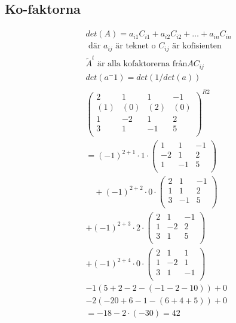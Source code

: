 \begin{multicols}{2}
\subsection{Ko-faktorna}
\begin{align*} %
  &det(A) = a_{i1}C_{i1}+a_{i2}C_{i2}+\ldots{}+a_{in}C_{in} \\
  &\text{ där $a_{ij}$ är teknet o $C_{ij}$ är kofisienten} \\
  &\tilde{A}^t \text{ är alla kofaktorerna från} A C_{ij} \\
  &det(a^-1)=det(1/det(a)) \\
  &\\
  &\left(\begin{array}{cccc}
    2 & 1  & 1  & -1  \\
    (1) & (0)  & (2)  & (0)  \\
    1 & -2 & 1  & 2  \\
    3 & 1  & -1 & 5  \\
  \end{array}\right)^{R2} \\
  &=  (-1)^{2+1}\cdot{1}\cdot{}
  \left(\begin{array}{ccc}
    1  & 1  & -1  \\
    -2 & 1  & 2  \\
    1  & -1 & 5  \\
  \end{array}\right) \\
  &\quad + (-1)^{2+2}\cdot{0}\cdot{} 
  \left(\begin{array}{ccc}
    2 & 1  & -1  \\
    1 & 1  & 2  \\
    3 & -1  & 5  \\
  \end{array}\right) \\
  &+ (-1)^{2+3}\cdot{2}\cdot{}
  \left(\begin{array}{ccc}
    2 & 1  & -1  \\
    1 & -2 & 2  \\
    3 & 1  & 5  \\
  \end{array}\right) \\
  &+ (-1)^{2+4}\cdot{0}\cdot{}
  \left(\begin{array}{ccc}
    2 & 1  & 1  \\
    1 & -2 & 1  \\
    3 & 1  & -1  \\
  \end{array}\right) \\
  &-1(5+2-2-(-1-2-10))+0 \\
  &-2(-20+6-1-(6+4+5))+0 \\
  &= -18-2\cdot{(-30)} = 42 \\
\end{align*}


\end{multicols}
